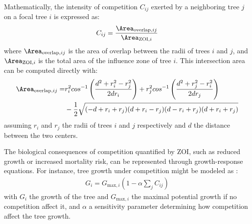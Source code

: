 Mathematically, the intensity of competition $C_{ij}$ exerted by a neighboring tree $j$ on a focal tree $i$ is expressed as:
\begin{align}
    C_{ij} = \frac{ \Area_{\text{overlap}, ij} }{ \Area_{\text{ZOI}, i} }
\end{align}
where $\Area_{\text{overlap}, ij}$ is the area of overlap between the radii of trees $i$ and $j$, and $\Area_{\text{ZOI}, i}$ is the total area of the influence zone of tree $i$. This intersection area can be computed directly with:
\begin{align}
    \Area_{\text{overlap}, ij} = &r_i^2 cos^{-1}\left( \frac{d^2 + r_i^2 - r_j^2}{2 d r_i} \right) + r_j^2 cos^{-1} \left(\frac{d^2 + r_j^2 - r_i^2}{2 d r_j} \right) \nonumber \\
    & - \frac{1}{2} \sqrt{(-d + r_i + r_j)(d + r_i - r_j)(d - r_i + r_j)(d + r_i + r_j)}
\end{align}
assuming $r_i$ and $r_j$ the radii of trees $i$ and $j$ respectively and $d$ the distance between the two centers.

The biological consequences of competition quantified by ZOI, such as reduced growth or increased mortality risk, can be represented through growth-response equations. For instance, tree growth under competition might be modeled as \cite{Das2012,Uriarte2004}:
\begin{align}
    G_i = G_{\text{max}, i} \left(1 - \alpha \sum_{j} {C_{ij}} \right)
\end{align}
with $G_i$ the growth of the tree and $G_{\text{max}, i}$ the maximal potential growth if no competition affect it, and $\alpha$ a sensitivity parameter determining how competition affect the tree growth.



